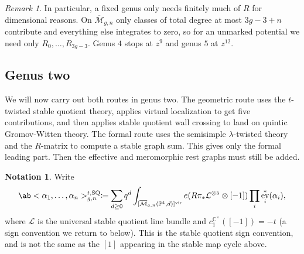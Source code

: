 \documentclass{amsart}
\theoremstyle{definition}
\newtheorem{notn}[thm]{Notation}
\theoremstyle{remark}
\newtheorem{rmk}[thm]{Remark}
\theoremstyle{plain}
\theoremstyle{definition}
\theoremstyle{remark}
\newcommand{\C}{\mathbb{C}}
\renewcommand{\P}{\mathbb{P}}
\newcommand{\Mbar}{\overline{\mathcal{M}}}
\newcommand{\mc}[1]{\mathcal{#1}}
\newcommand{\mr}[1]{\mathrm{#1}}
\newcommand{\1}{\mathbf{1}}
\newcommand{\2}{\mathbf{2}}
\newcommand{\3}{\mathbf{3}}
\newcommand{\vir}{\mr{vir}}
\DeclareMathOperator{\ev}{ev}
\begin{document}
\begin{rmk}
    In particular, a fixed genus only needs finitely much of \(R\) for dimensional reasons. On \(\Mbar_{g,n}\) only classes of total degree at most \(3g-3+n\) contribute and everything else integrates to zero, so for an unmarked potential we need only \(R_0, \ldots, R_{3g-3}\). Genus \(4\) stops at \(z^9\) and genus \(5\) at \(z^{12}\).
\end{rmk}

\subsection{Genus two}%
\label{sub:Genus two}

We will now carry out both routes in genus two. The geometric route uses the \(t\)-twisted stable quotient theory, applies virtual localization to get five contributions, and then applies stable quotient wall crossing to land on quintic Gromov-Witten theory. The formal route uses the semisimple \(\lambda\)-twisted theory and the \(R\)-matrix to compute a stable graph sum. This gives only the formal leading part. Then the effective and meromorphic rest graphs must still be added.

\begin{notn}
    Write
    \[ \ab<\alpha_1, \ldots, \alpha_n>^{t,\mr{SQ}}_{g,n} \coloneqq \sum_{d\geq0}q^d \int_{[\Mbar_{g,n}(\P^4,d)]^{\vir}}e(R\pi_*\mc{L}^{\otimes 5}\otimes[-1])\prod_i \ev_i^*(\alpha_i), \]
    where \(\mc{L}\) is the universal stable quotient line bundle and \(c_1^{\C^{\times}}([-1]) = -t\) (a sign convention we return to below). This is the stable quotient sign convention, and is not the same as the \([1]\) appearing in the stable map cycle above.
\end{notn}
\end{document}
